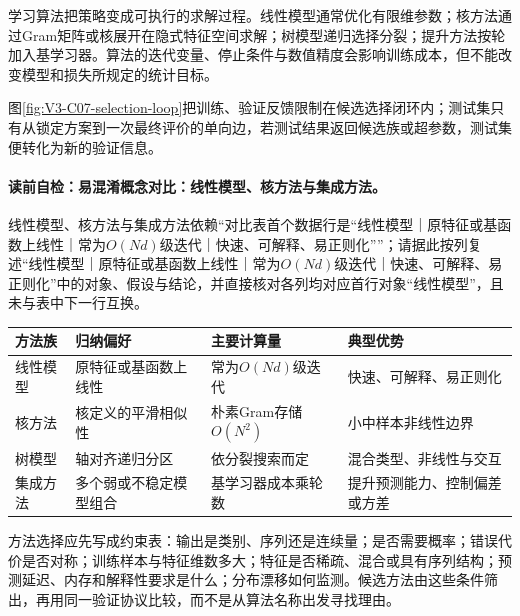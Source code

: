 学习算法把策略变成可执行的求解过程。线性模型通常优化有限维参数；核方法通过Gram矩阵或核展开在隐式特征空间求解；树模型递归选择分裂；提升方法按轮加入基学习器。算法的迭代变量、停止条件与数值精度会影响训练成本，但不能改变模型和损失所规定的统计目标。

\label{struct:V3-C07-CH17}

图\ref{fig:V3-C07-selection-loop}把训练、验证反馈限制在候选选择闭环内；测试集只有从锁定方案到一次最终评价的单向边，若测试结果返回候选族或超参数，测试集便转化为新的验证信息。

\paragraph{读前自检：易混淆概念对比：线性模型、核方法与集成方法。}线性模型、核方法与集成方法依赖“对比表首个数据行是“线性模型｜原特征或基函数上线性｜常为$O(Nd)$级迭代｜快速、可解释、易正则化””；请据此按列复述“线性模型｜原特征或基函数上线性｜常为$O(Nd)$级迭代｜快速、可解释、易正则化”中的对象、假设与结论，并直接核对各列均对应首行对象“线性模型”，且未与表中下一行互换。\par

\begin{comparisonbox}
\begin{tabularx}{\linewidth}{@{}l X X X@{}}
\toprule 方法族 & 归纳偏好 & 主要计算量 & 典型优势\\ \midrule
线性模型 & 原特征或基函数上线性 & 常为$O(Nd)$级迭代 & 快速、可解释、易正则化\\
核方法 & 核定义的平滑相似性 & 朴素Gram存储$O(N^2)$ & 小中样本非线性边界\\
树模型 & 轴对齐递归分区 & 依分裂搜索而定 & 混合类型、非线性与交互\\
集成方法 & 多个弱或不稳定模型组合 & 基学习器成本乘轮数 & 提升预测能力、控制偏差或方差\\
\bottomrule
\end{tabularx}
\end{comparisonbox}


方法选择应先写成约束表：输出是类别、序列还是连续量；是否需要概率；错误代价是否对称；训练样本与特征维数多大；特征是否稀疏、混合或具有序列结构；预测延迟、内存和解释性要求是什么；分布漂移如何监测。候选方法由这些条件筛出，再用同一验证协议比较，而不是从算法名称出发寻找理由。

